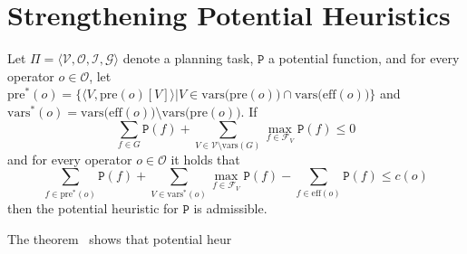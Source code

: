 
\chapter{Strengthening Potential Heuristics}\label{ch:strengthening-potential-heuristics}


\begin{theorem}
    Let $\Pi = \langle \mathcal{V}, \mathcal{O}, \mathcal{I}, \mathcal{G} \rangle$ denote a planning task, $\mathtt{P}$ a
    potential function, and for every operator $o\in\mathcal{O}$, let
    $\mathrm{pre}^*(o)=\{\langle V, \mathrm{pre}(o)[V]\rangle |V\in \mathrm{vars(pre}(o))\cap\mathrm{vars(eff}(o))\}$ and
    $\mathrm{vars}^*(o)=\mathrm{vars(eff}(o))\setminus\mathrm{vars(pre}(o))$. If
    \[\sum_{f\in G}\mathtt{P}(f)+\sum_{V\in\mathcal{V}\setminus\mathrm{vars}(G)}\max_{f\in\mathcal{F}_V}\mathtt{P}(f)\leq0\]
    and for every operator $o\in\mathcal{O}$ it holds that
    \[\sum_{f\in\mathrm{pre}^*(o)}\mathtt{P}(f)+\sum_{V\in\mathrm{vars}^*(o)}\max_{f\in\mathcal{F}_V}\mathtt{P}(f)-\sum_{f\in\mathrm{eff}(o)}\mathtt{P}(f)\leq c(o)\]
    then the potential heuristic for $\mathtt{P}$ is admissible.
\end{theorem}

The theorem~\cite{fivser2020strengthening} shows that potential heur
